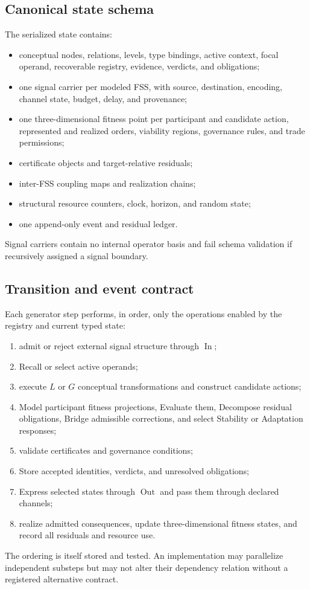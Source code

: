 \documentclass[11pt]{article}
\newcommand{\InOp}{\operatorname{In}}
\newcommand{\OutOp}{\operatorname{Out}}
\begin{document}
\subsection{Canonical state schema}

The serialized state contains:
\begin{itemize}
\item conceptual nodes, relations, levels, type bindings, active context, focal operand, recoverable registry, evidence, verdicts, and obligations;
\item one signal carrier per modeled FSS, with source, destination, encoding, channel state, budget, delay, and provenance;
\item one three-dimensional fitness point per participant and candidate action, represented and realized orders, viability regions, governance rules, and trade permissions;
\item certificate objects and target-relative residuals;
\item inter-FSS coupling maps and realization chains;
\item structural resource counters, clock, horizon, and random state;
\item one append-only event and residual ledger.
\end{itemize}
Signal carriers contain no internal operator basis and fail schema validation if recursively assigned a signal boundary.

\subsection{Transition and event contract}

Each generator step performs, in order, only the operations enabled by the registry and current typed state:
\begin{enumerate}
\item admit or reject external signal structure through $\InOp$;
\item Recall or select active operands;
\item execute $L$ or $G$ conceptual transformations and construct candidate actions;
\item Model participant fitness projections, Evaluate them, Decompose residual obligations, Bridge admissible corrections, and select Stability or Adaptation responses;
\item validate certificates and governance conditions;
\item Store accepted identities, verdicts, and unresolved obligations;
\item Express selected states through $\OutOp$ and pass them through declared channels;
\item realize admitted consequences, update three-dimensional fitness states, and record all residuals and resource use.
\end{enumerate}
The ordering is itself stored and tested. An implementation may parallelize independent substeps but may not alter their dependency relation without a registered alternative contract.
\end{document}
